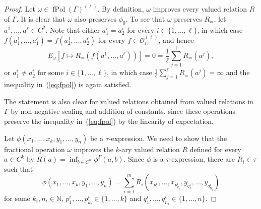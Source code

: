 \documentclass[nonacm]{acmart}
\newcommand{\N}{\mathbb N}
\DeclareMathOperator{\fPol}{fPol}
\begin{document}
\begin{proof}
Let $\omega \in \fPol(\Gamma)^{(\ell)}$. 
By definition, $\omega$ improves every valued relation $R$ of $\Gamma$. 
It is clear that $\omega$ also preserves $\phi_{\emptyset}$. To see that $\omega$ preserves $R_=$, let $a^1,\dots,a^{\ell} \in C^2$. Note that either 
$a^i_1 = a^i_2$ for every $i \in \{1,\dots,\ell\}$, in which case
$f(a^1_1,\dots,a^{\ell}_1)=f(a^1_2,\dots,a^{\ell}_2)$ for every $f \in {\mathscr O}_C^{(\ell)}$, and hence 
$$ E_\omega[f \mapsto R_=(f(a^1,\dots,a^{\ell}))]
= 0 = \frac{1}{\ell} \sum_{j = 1}^{\ell} R_=(a^j),
$$
or $a^i_1 \neq a^i_2$ for some $i \in \{1,\dots,\ell\}$, in which case $\frac{1}{\ell} \sum_{j = 1}^{\ell} R_=(a^j) = \infty$ and the inequality 
in~(\ref{eq:fpol}) is again satisfied. 

The statement is also clear for valued relations
obtained from valued relations in $\Gamma$
by non-negative scaling and addition of constants, since these operations preserve the inequality in~(\ref{eq:fpol}) by the linearity of expectation. 

Let $\phi(x_1,\dots,x_k, y_1, \dots, y_n)$ be a  $\tau$-expression. We need to show that 
the fractional operation $\omega$ improves the $k$-ary valued relation $R$ defined for every $a\in C^k$ by $R(a)= \inf_{b\in C^n} \phi^{\Gamma}(a,b)$. Since $\phi$ is a $\tau$-expression, there are $R_i\in \tau$ such that 
\[\phi(x_1,\dots,x_k, y_1, \dots, y_n)=\sum_{i=1}^m R_i(x_{p_1^i}, \dots, x_{p_{k_i}^i},y_{q_1^i}, \dots, y_{q_{n_i}^i})\]
for some $k_i, n_i \in \N$, $p_1^i, \dots, p_{k_i}^i\in \{1, \dots, k\}$ and $q_1^i, \dots, q_{n_i}^i\in \{1, \dots, n\}$.


\end{proof}
\end{document}

